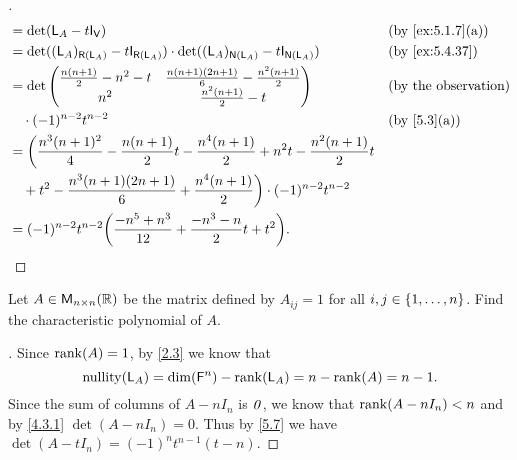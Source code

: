 \begin{proof}[]
\begin{align*}
		 & = \det(\L_A - t \IT[\V])                                                                                         &  & \by{ex:5.1.7}[a] \\
		 & = \det((\L_A)_{\rg{\L_A}} - t \IT[\rg{\L_A}]) \cdot \det((\L_A)_{\ns{\L_A}} - t \IT[\ns{\L_A}])                  &  & \by{ex:5.4.37}   \\
		 & = \det\begin{pmatrix}
			         \frac{n(n + 1)}{2} - n^2 - t & \frac{n(n + 1)(2n + 1)}{6} - \frac{n^2 (n + 1)}{2} \\
			         n^2                          & \frac{n^2 (n + 1)}{2} - t
		         \end{pmatrix}                             &  & \text{(by the observation)}                                                \\
		 & \quad \cdot (-1)^{n - 2} t^{n - 2}                                                                               &  & \by{5.3}[a]      \\
		 & = \bigg(\frac{n^3 (n + 1)^2}{4} - \frac{n(n + 1)}{2} t - \frac{n^4 (n + 1)}{2} + n^2 t - \frac{n^2 (n + 1)}{2} t                       \\
		 & \quad + t^2 - \frac{n^3 (n + 1)(2n + 1)}{6} + \frac{n^4 (n + 1)}{2}\bigg) \cdot (-1)^{n - 2} t^{n - 2}                                 \\
		 & = (-1)^{n - 2} t^{n - 2} \pa{\frac{-n^5 + n^3}{12} + \frac{-n^3 - n}{2} t + t^2}.
	\end{align*}
\end{proof}

\begin{ex}\label{ex:5.4.42}
	Let \(A \in \mathsf{M}_{{n} \times n}({\mathbb{R}})\) be the matrix defined by \(A_{i j} = 1\) for all \(i, j \in \left\lbrace1, \dots, n\right\rbrace\).
	Find the characteristic polynomial of \(A\).
\end{ex}

\begin{proof}[]
	Since \(\rk{A} = 1\), by \cref{2.3} we know that
	\[
		\nt{\L_A} = \dim(\vs{F}^n) - \rk{\L_A} = n - \rk{A} = n - 1.
	\]
	Since the sum of columns of \(A - n I_n\) is \(\mathit{0}\), we know that \(\rk{A - n I_n} < n\) and by \cref{4.3.1} \(\det(A - n I_n) = 0\).
	Thus by \cref{5.7} we have \(\det(A - t I_n) = (-1)^n t^{n - 1} (t - n)\).
\end{proof}
